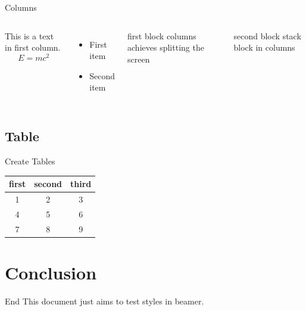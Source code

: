    \begin{frame}{Columns}
        \begin{columns}
            This is a text in first column.
            $$E=mc^2$$
            \begin{itemize}
            \item First item
            \item Second item
            \end{itemize}
            
            \begin{block}{first block}
                columns achieves splitting the screen
            \end{block}
            \begin{block}{second block}
                stack block in columns
            \end{block}
            
        \end{columns}
    \end{frame}

    \subsection{Table}
    



    \begin{frame}{Create Tables}
        \begin{center}
            \begin{table}[!t]  
                \begin{tabular}{ccc}  
                    \toprule   
                    first&second&third\\ 
                    \midrule       
                    1 & 2 & 3 \\ 
                    4 & 5 & 6 \\ 
                    7 & 8 & 9 \\
                    \bottomrule  
                \end{tabular}
            \end{table}
        \end{center}
    \end{frame}

    \section{Conclusion}

    \begin{frame}{End}
        This document just aims to test styles in beamer.
    \end{frame}

 